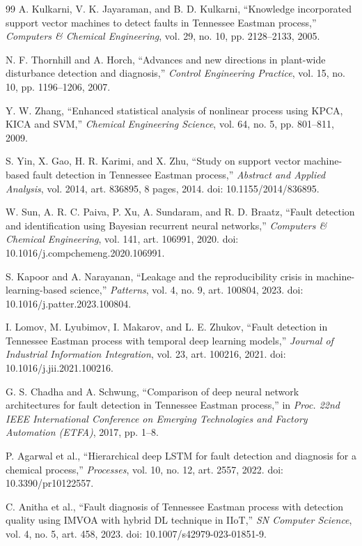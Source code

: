 \documentclass[10pt,twocolumn,a4paper]{article}
\begin{document}
\begin{thebibliography}{99}
A. Kulkarni, V. K. Jayaraman, and B. D. Kulkarni, ``Knowledge incorporated
support vector machines to detect faults in Tennessee Eastman process,''
\emph{Computers \& Chemical Engineering}, vol. 29, no. 10, pp. 2128--2133,
2005.

N. F. Thornhill and A. Horch, ``Advances and new directions in plant-wide
disturbance detection and diagnosis,'' \emph{Control Engineering Practice},
vol. 15, no. 10, pp. 1196--1206, 2007.

Y. W. Zhang, ``Enhanced statistical analysis of nonlinear process using KPCA,
KICA and SVM,'' \emph{Chemical Engineering Science}, vol. 64, no. 5,
pp. 801--811, 2009.

S. Yin, X. Gao, H. R. Karimi, and X. Zhu, ``Study on support vector
machine-based fault detection in Tennessee Eastman process,'' \emph{Abstract
and Applied Analysis}, vol. 2014, art. 836895, 8 pages, 2014.
doi: 10.1155/2014/836895.

W. Sun, A. R. C. Paiva, P. Xu, A. Sundaram, and R. D. Braatz, ``Fault detection
and identification using Bayesian recurrent neural networks,'' \emph{Computers
\& Chemical Engineering}, vol. 141, art. 106991, 2020.
doi: 10.1016/j.compchemeng.2020.106991.

S. Kapoor and A. Narayanan, ``Leakage and the reproducibility crisis in
machine-learning-based science,'' \emph{Patterns}, vol. 4, no. 9, art. 100804,
2023. doi: 10.1016/j.patter.2023.100804.

I. Lomov, M. Lyubimov, I. Makarov, and L. E. Zhukov, ``Fault detection in
Tennessee Eastman process with temporal deep learning models,'' \emph{Journal
of Industrial Information Integration}, vol. 23, art. 100216, 2021.
doi: 10.1016/j.jii.2021.100216.

G. S. Chadha and A. Schwung, ``Comparison of deep neural network architectures
for fault detection in Tennessee Eastman process,'' in \emph{Proc. 22nd IEEE
International Conference on Emerging Technologies and Factory Automation
(ETFA)}, 2017, pp. 1--8.

P. Agarwal et al., ``Hierarchical deep LSTM for fault detection and diagnosis
for a chemical process,'' \emph{Processes}, vol. 10, no. 12, art. 2557, 2022.
doi: 10.3390/pr10122557.

C. Anitha et al., ``Fault diagnosis of Tennessee Eastman process with detection
quality using IMVOA with hybrid DL technique in IIoT,'' \emph{SN Computer
Science}, vol. 4, no. 5, art. 458, 2023. doi: 10.1007/s42979-023-01851-9.


\end{thebibliography}
\end{document}
